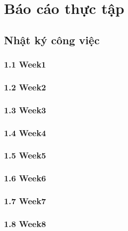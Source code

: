 \providecommand{\tightlist}{%
  \setlength{\itemsep}{0pt}\setlength{\parskip}{0pt}%
}

\section{Báo cáo thực tập}

\subsection{Nhật ký công việc}

\subsubsection{1.1 Week1}


\subsubsection{1.2 Week2}


\subsubsection{1.3 Week3}


\subsubsection{1.4 Week4}


\subsubsection{1.5 Week5}


\subsubsection{1.6 Week6}


\subsubsection{1.7 Week7}


\subsubsection{1.8 Week8}


